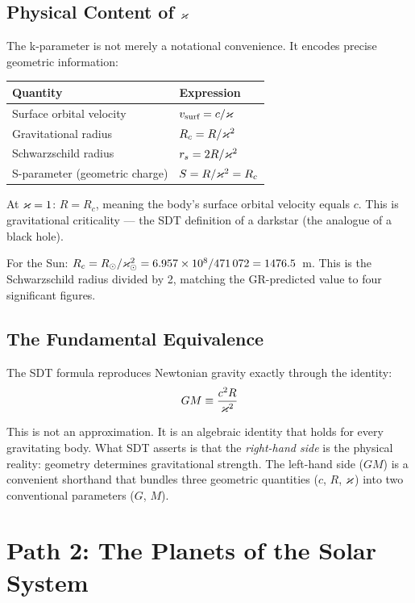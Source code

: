 \subsection{Physical Content of $\varkappa$}

The k-parameter is not merely a notational convenience.  It encodes precise geometric information:

\begin{center}
\begin{tabular}{ll}
\toprule
\textbf{Quantity} & \textbf{Expression} \\
\midrule
Surface orbital velocity & $v_{\text{surf}} = c/\varkappa$ \\
Gravitational radius & $R_c = R/\varkappa^2$ \\
Schwarzschild radius & $r_s = 2R/\varkappa^2$ \\
S-parameter (geometric charge) & $S = R/\varkappa^2 = R_c$ \\
\bottomrule
\end{tabular}
\end{center}

At $\varkappa = 1$: $R = R_c$, meaning the body's surface orbital velocity equals $c$.  This is gravitational criticality --- the SDT definition of a darkstar (the analogue of a black hole).

For the Sun: $R_c = R_\odot/\varkappa_\odot^2 = 6.957 \times 10^8 / 471\,072 = 1476.5$~m.  This is the Schwarzschild radius divided by 2, matching the GR-predicted value to four significant figures.

\subsection{The Fundamental Equivalence}

The SDT formula reproduces Newtonian gravity exactly through the identity:
\begin{equation}\label{eq:equivalence}
  GM \equiv \frac{c^2 R}{\varkappa^2}
\end{equation}

This is not an approximation.  It is an algebraic identity that holds for every gravitating body.  What SDT asserts is that the \emph{right-hand side} is the physical reality: geometry determines gravitational strength.  The left-hand side ($GM$) is a convenient shorthand that bundles three geometric quantities ($c$, $R$, $\varkappa$) into two conventional parameters ($G$, $M$).


\section{Path 2: The Planets of the Solar System}
\label{sec:path2}

